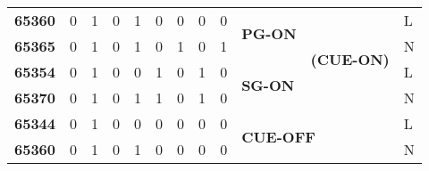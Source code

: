 \begin{table}[]
\begin{tabular}{|l|llllllll|l|c|l|}
\textbf{65360}                                                  & 0             & 1                               & 0               & 1           & 0                                & 0                                & 0                                & 0                                & \multirow{2}{*}{\textbf{PG-ON}}                      & \multirow{4}{*}{\textbf{(CUE-ON)}} & L      \\ \cline{1-9} \cline{12-12} 
\textbf{65365}                                                  & 0             & 1                               & 0               & 1           & 0                                & 1                                & 0                                & 1                                &                                                      &                                    & N      \\ \cline{1-10} \cline{12-12} 
\textbf{65354}                                                  & 0             & 1                               & 0               & 0           & 1                                & 0                                & 1                                & 0                                & \multirow{2}{*}{\textbf{SG-ON}}                      &                                    & L      \\ \cline{1-9} \cline{12-12} 
\textbf{65370}                                                  & 0             & 1                               & 0               & 1           & 1                                & 0                                & 1                                & 0                                &                                                      &                                    & N      \\ \hline
\textbf{65344}                                                  & 0             & 1                               & 0               & 0           & 0                                & 0                                & 0                                & 0                                & \multicolumn{2}{l|}{\multirow{2}{*}{\textbf{CUE-OFF}}}                                    & L      \\ \cline{1-9} \cline{12-12} 
\textbf{65360}                                                  & 0             & 1                               & 0               & 1           & 0                                & 0                                & 0                                & 0                                & \multicolumn{2}{l|}{}                                                                     & N      \\ \hline

\end{tabular}
\end{table}
